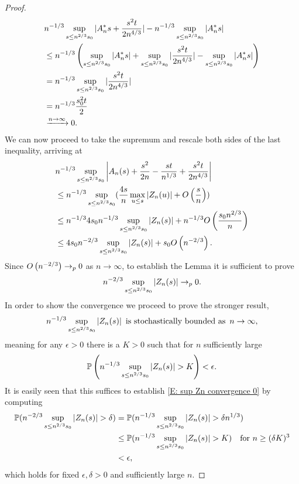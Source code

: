 \begin{proof}
    \begin{align*}
    &n^{-1 / 3}\sup_{s \leq n^{2 / 3} s_0 } | A^*_n{s} + \frac{s^2t}{2n^{4 / 3}}  | - n^{-1 / 3}\sup_{s \leq n^{2 / 3} s_0 } | A^*_n{s} | \\
    &\leq n^{-1 / 3} \left( \sup_{s \leq n^{2 / 3} s_0 } | A^*_n{s} | + \sup_{s \leq n^{2 / 3} s_0 } |\frac{s^2t}{2n^{4 / 3}}|  - \sup_{s \leq n^{2 / 3} s_0 } | A^*_n{s} | \right) \\
    &= n^{-1 / 3} \sup_{s \leq n^{2 / 3} s_0 } |\frac{s^2t}{2n^{4 / 3}}| \\
    &= n^{-1 / 3} \frac{s_0^2t}{2} \\
    &\xrightarrow{n \rightarrow \infty} 0.
    \end{align*}
    We can now proceed to take the supremum and rescale both sides of the last inequality, arriving at
    \begin{equation}
    \begin{aligned}
    &n^{-1 / 3} \sup_{s \leq n^{2 / 3} s_0 } \left| A_n(s) + \frac{s^2}{2n} - \frac{st}{n^{1 / 3}}  + \frac{s^2t}{2n^{4 / 3}}  \right| \\
    &\leq n^{-1 / 3} \sup_{s \leq n^{2 / 3} s_0 } (\frac{4s}{n} \max_{u \leq s} |Z_n(u)| + O\left(\frac{s}{n}\right)) \\
    &\leq n^{-1 / 3} 4 s_0 n^{-1 / 3} \sup_{s \leq n^{2 / 3} s_0 } |Z_n(s)| + n^{-1 / 3}O\left(\frac{s_0 n^{2 / 3}}{n}\right) \\
    &\leq 4 s_0 n^{-2 / 3} \sup_{s \leq n^{2 / 3} s_0 } |Z_n(s)| + s_0 O\left(n^{-2 / 3}\right).
    \end{aligned}
    \end{equation}
    Since $O\left(n^{-2 / 3}\right) \rightarrow_p 0$ as $n \rightarrow \infty$, to establish the Lemma it is sufficient to prove
    \begin{equation} \label{E: sup Zn convergence 0}
    n^{-2 / 3} \sup_{s \leq n^{2 / 3} s_0 } |Z_n(s)| \rightarrow_p 0.
    \end{equation}
    In order to show the convergence we proceed to prove the stronger result,
    \begin{equation}
    n^{-1/3} \sup_{s \leq n^{2 / 3} s_0 } |Z_n(s)| 
    \enspace \text{is stochastically bounded as} \enspace n \rightarrow \infty ,
    \end{equation} 
    meaning for any  $ \epsilon > 0 $  there is a $ K > 0 $
    such that for $n$ sufficiently large 
    \begin{equation} \label{E: stoch bounded}
    \mathbb{P}\left( n^{-1/3} \sup_{s \leq n^{2 / 3} s_0 } |Z_n(s)| > K \right) < \epsilon. 
    \end{equation}
    It is easily seen that this suffices to establish \eqref{E: sup Zn convergence 0} by computing
    \begin{equation*}
    \begin{aligned}
    \mathbb{P}( n^{-2 / 3} \sup_{s \leq n^{2 / 3} s_0 } |Z_n(s)| > \delta)
	&= \mathbb{P}( n^{-1 / 3} \sup_{s \leq n^{2 / 3} s_0 } |Z_n(s)| > \delta n^{1 / 3} ) \\
	&\leq \mathbb{P}( n^{-1 / 3} \sup_{s \leq n^{2 / 3} s_0 } |Z_n(s)| > K) \quad \text{for $n \geq (\delta K)^3$} \\
	&< \epsilon,
    \end{aligned}
    \end{equation*}
    which holds for fixed $\epsilon, \delta > 0$ and sufficiently large $n$.
    

\end{proof}
